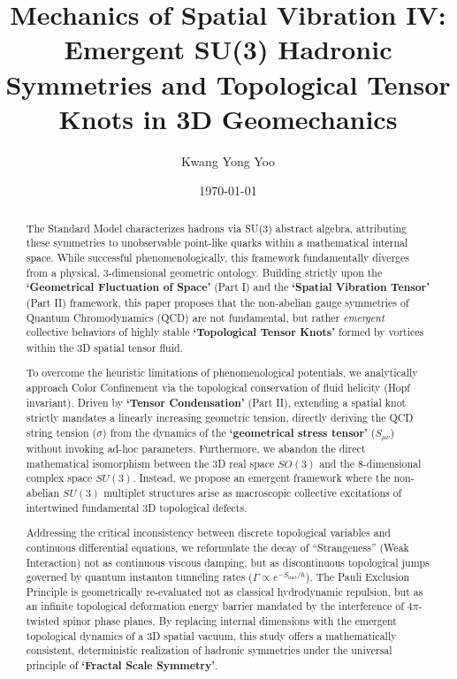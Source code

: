 \documentclass[reprint,amsmath,amssymb,aps,prd]{revtex4-2}
\begin{document}

\title{Mechanics of Spatial Vibration IV: Emergent SU(3) Hadronic Symmetries and Topological Tensor Knots in 3D Geomechanics}

\author{Kwang Yong Yoo}

\date{\today}

\begin{abstract}
The Standard Model characterizes hadrons via SU(3) abstract algebra, attributing these symmetries to unobservable point-like quarks within a mathematical internal space. While successful phenomenologically, this framework fundamentally diverges from a physical, 3-dimensional geometric ontology. Building strictly upon the \textbf{`Geometrical Fluctuation of Space'} (Part I) and the \textbf{`Spatial Vibration Tensor'} (Part II) framework, this paper proposes that the non-abelian gauge symmetries of Quantum Chromodynamics (QCD) are not fundamental, but rather \textit{emergent} collective behaviors of highly stable \textbf{`Topological Tensor Knots'} formed by vortices within the 3D spatial tensor fluid. 

To overcome the heuristic limitations of phenomenological potentials, we analytically approach Color Confinement via the topological conservation of fluid helicity (Hopf invariant). Driven by \textbf{`Tensor Condensation'} (Part II), extending a spatial knot strictly mandates a linearly increasing geometric tension, directly deriving the QCD string tension ($\sigma$) from the dynamics of the \textbf{`geometrical stress tensor'} ($S_{\mu\nu}$) without invoking ad-hoc parameters. Furthermore, we abandon the direct mathematical isomorphism between the 3D real space $SO(3)$ and the 8-dimensional complex space $SU(3)$. Instead, we propose an emergent framework where the non-abelian $SU(3)$ multiplet structures arise as macroscopic collective excitations of intertwined fundamental 3D topological defects.

Addressing the critical inconsistency between discrete topological variables and continuous differential equations, we reformulate the decay of ``Strangeness'' (Weak Interaction) not as continuous viscous damping, but as discontinuous topological jumps governed by quantum instanton tunneling rates ($\Gamma \propto e^{-S_{\mathrm{inst}}/\hbar}$). The Pauli Exclusion Principle is geometrically re-evaluated not as classical hydrodynamic repulsion, but as an infinite topological deformation energy barrier mandated by the interference of $4\pi$-twisted spinor phase planes. By replacing internal dimensions with the emergent topological dynamics of a 3D spatial vacuum, this study offers a mathematically consistent, deterministic realization of hadronic symmetries under the universal principle of \textbf{`Fractal Scale Symmetry'}.
\end{abstract}
\end{document}
